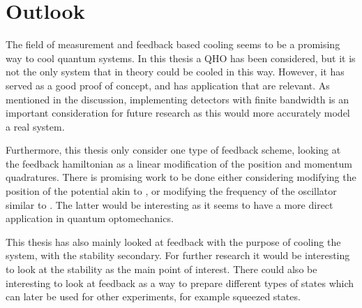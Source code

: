 \section{Outlook}
The field of measurement and feedback based cooling seems to be a promising way to cool quantum systems. In this thesis a QHO has been considered, but it is not the only system that in theory could be cooled in this way. However, it has served as a good proof of concept, and has application that are relevant. As mentioned in the discussion, implementing detectors with finite bandwidth is an important consideration for future research as this would more accurately model a real system. 

Furthermore, this thesis only consider one type of feedback scheme, looking at the feedback hamiltonian as a linear modification of the position and momentum quadratures. There is promising work to be done either considering modifying the position of the potential akin to \cite{De-Sousa:2025}, or modifying the frequency of the oscillator similar to \cite{Habibi:2016}. The latter would be interesting as it seems to have a more direct application in quantum optomechanics.

This thesis has also mainly looked at feedback with the purpose of cooling the system, with the stability secondary. For further research it would be interesting to look at the stability as the main point of interest. There could also be interesting to look at feedback as a way to prepare different types of states which can later be used for other experiments, for example squeezed states.